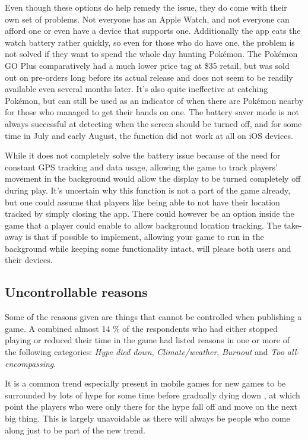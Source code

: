 Even though these options do help remedy the issue, they do come with their own set of problems. Not everyone has an Apple Watch, and not everyone can afford one or even have a device that supports one. Additionally the app eats the watch battery rather quickly, so even for those who do have one, the problem is not solved if they want to spend the whole day hunting Pokémon. The Pokémon GO Plus comparatively had a much lower price tag at \$35 retail, but was sold out on pre-orders long before its actual release and does not seem to be readily available even several months later. It's also quite ineffective at catching Pokémon, but can still be used as an indicator of when there are Pokémon nearby for those who managed to get their hands on one. The battery saver mode is not always successful at detecting when the screen should be turned off, and for some time in July and early August, the function did not work at all on iOS devices.

While it does not completely solve the battery issue because of the need for constant GPS tracking and data usage, allowing the game to track players' movement in the background would allow the display to be turned completely off during play. It's uncertain why this function is not a part of the game already, but one could assume that players like being able to not have their location tracked by simply closing the app. There could however be an option inside the game that a player could enable to allow background location tracking. The take-away is that if possible to implement, allowing your game to run in the background while keeping some functionality intact, will please both users and their devices.

\subsection{Uncontrollable reasons}
Some of the reasons given are things that cannot be controlled when publishing a game. A combined almost 14 \% of the respondents who had either stopped playing or reduced their time in the game had listed reasons in one or more of the following categories: \emph{Hype died down}, \emph{Climate/weather}, \emph{Burnout} and \emph{Too all-encompassing}.

It is a common trend especially present in mobile games for new games to be surrounded by lots of hype for some time before gradually dying down , at which point the players who were only there for the hype fall off and move on the next big thing. This is largely unavoidable as there will always be people who come along just to be part of the new trend.

